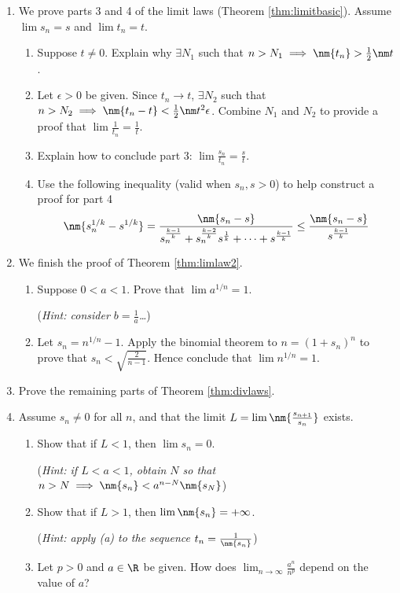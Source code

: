 \begin{exercisessec}{}{}
\begin{enumerate}
	\item\label{exs:limitlawsfinish} We prove parts 3 and 4 of the limit laws (Theorem \ref{thm:limitbasic}). Assume $\lim s_n= s$ and $\lim t_n=t$.
	\begin{enumerate}
	  \item Suppose $t\neq 0$. Explain why $\exists N_1$ such that $n>N_1\implies \nm{t_n}>\frac 12\nm t$.
	  \item Let $\epsilon>0$ be given. Since $t_n\to t$, $\exists N_2$ such that $n>N_2\implies \nm{t_n-t}<\frac 12\nm t^2\epsilon$. Combine $N_1$ and $N_2$ to provide a proof that $\lim\frac 1{t_n}=\frac 1t$.
	  \item Explain how to conclude part 3: $\lim\frac{s_n}{t_n}=\frac st$.
	  \item Use the following inequality (valid when $s_n,s>0$) to help construct a proof for part 4
		\[\nm{s_n^{1/k}-s^{1/k}}=\frac{\nm{s_n-s}}{{s_n^{\frac{k-1}k}+s_n^{\frac{k-2}k}s^{\frac 1k}+\cdots +s^{\frac{k-1}k}}}\le \frac{\nm{s_n-s}}{s^{\frac{k-1}k}}\]
 	\end{enumerate}


		\item\label{exs:nrootlimit}
		We finish the proof of Theorem \ref{thm:limlaw2}.
		\begin{enumerate}
		  \item Suppose $0<a<1$. Prove that $\lim a^{1/n}=1$.\par
			(\emph{Hint: consider $b=\frac 1a$\ldots})
			\item Let $s_n=n^{1/n}-1$. Apply the binomial theorem to $n=(1+s_n)^n$ to prove that $s_n<\sqrt{\frac 2{n-1}}$.
			Hence conclude that $\lim n^{1/n}=1$.
		\end{enumerate}
		
		
		\item Prove the remaining parts of Theorem \ref{thm:divlaws}.
		
		
		\item%
  	Assume $s_n\neq 0$ for all $n$, and that the limit $L=\lim\smash[b]{\nm{\frac{s_{n+1}}{s_n}}}$ exists.
  \begin{enumerate}
	  \item Show that if $L<1$, then $\lim s_n=0$.\par
	  (\emph{Hint: if $L<a<1$, obtain $N$ so that $n>N\implies\nm{s_n}<a^{n-N}\nm{s_N}$})
	  \item Show that if $L>1$, then $\lim\nm{s_n}=+\infty$.\par
	  (\emph{Hint: apply (a) to the sequence $t_n=\frac 1{\nm{s_n}}$})
	  \item%
	  Let $p>0$ and $a\in\R$ be given. How does $\lim_{n\to\infty}\frac{a^n}{n^p}$ depend on the value of $a$?
  \end{enumerate}

	\end{enumerate}
\end{exercisessec}


